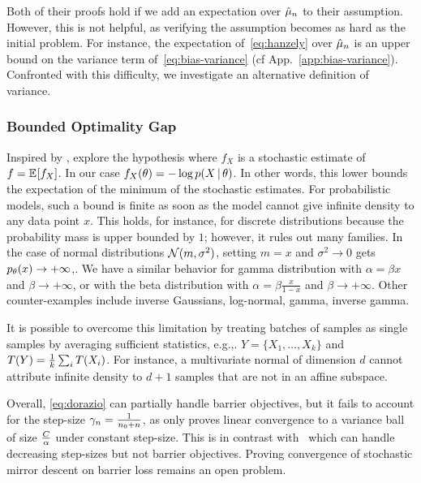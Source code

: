 Both of their proofs hold if we add an expectation over $\hat {\mu}_n$ to their assumption.
However, this is not helpful, as verifying the assumption becomes as hard as the initial problem.
For instance, the expectation of~\eqref{eq:hanzely} over $\hat {\mu}_n$ is an upper bound on the variance term of~\eqref{eq:bias-variance} (cf App.~\ref{app:bias-variance}).
Confronted with this difficulty, we investigate an alternative definition of variance.

\subsubsection{Bounded Optimality Gap}
Inspired by \citet{loizou2021stochastic}, \citet{dorazio2021stochastic} explore the hypothesis
where $f_X$ is a stochastic estimate of $f = \mathbb{E}_{} [ f_X ] $. In our case $f_X(\theta) = - \log p(X\,\vert\, \theta)$.
In other words, this lower bounds the expectation of the minimum of the stochastic estimates.
For probabilistic models, such a bound is finite as soon as the model cannot give infinite density to any data point $x$.
This holds, for instance, for discrete distributions because the probability mass is upper bounded by $1$; however, it rules out many families.
In the case of normal distributions ${\mathcal N}(m, \sigma^2)$, setting $m=x$ and $\sigma^2 \rightarrow 0$ gets $p_\theta (x) \rightarrow +\infty$,.
We have a similar behavior for gamma distribution with $\alpha = \beta x$ and $\beta \rightarrow +\infty$, or with the beta distribution with $\alpha=\beta \frac{x}{1-x}$ and $\beta \rightarrow +\infty$.
Other counter-examples include inverse Gaussians, log-normal, gamma, inverse gamma.

It is possible to overcome this limitation by treating batches of samples as single samples by averaging sufficient statistics, e.g.,. $Y = \{X_1, \dots, X_k\}$ and $T(Y) = \frac{1}{k}\sum_i T(X_i)$.
For instance, a multivariate normal of dimension $d$ cannot attribute infinite density to $d+1$ samples that are not in an affine subspace.

Overall, \eqref{eq:dorazio} can partially handle barrier objectives, but it fails to account for the step-size $\gamma_n = \frac{1}{n_0+n}$, as \citet[Thm.1]{dorazio2021stochastic} only proves linear convergence to a variance ball of size $\frac{C}{\alpha}$ under constant step-size.
This is in contrast with~\citet{dragomir2021fast} which can handle decreasing step-sizes but not barrier objectives.
Proving convergence of stochastic mirror descent on barrier loss remains an open problem.


